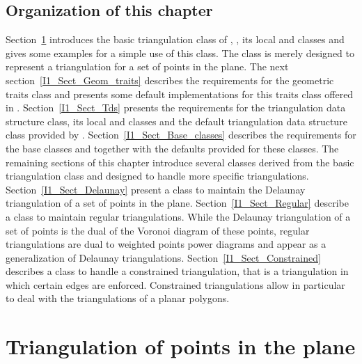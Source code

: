 \subsection*{Organization of this chapter}
Section~\ref{I1_Sect_Triangulation_2} introduces the basic triangulation class of \cgal ,
 , its local  and 
classes and gives some examples for a simple use of this class.
 The  class  is merely designed to represent 
a triangulation for a set of points in the plane.
The next section~\ref{I1_Sect_Geom_traits}
describes the requirements for the geometric
traits class and presents some default implementations
for this traits class offered in \cgal. 
Section~\ref{I1_Sect_Tds}  presents the requirements for the 
{triangulation data structure} class,
 its local  and 
classes and the default {triangulation data structure} class
provided by \cgal. 
Section~\ref{I1_Sect_Base_classes} describes the requirements
for the base classes  and   
together with the defaults provided for these classes.
The remaining sections of this chapter introduce
several classes derived from the basic triangulation class
and designed to handle more specific triangulations.
Section~\ref{I1_Sect_Delaunay} present a class to 
maintain the Delaunay triangulation of a set of points in the plane.
 Section~\ref{I1_Sect_Regular}
describe a class to maintain regular triangulations.
While the Delaunay triangulation of a set of points
is the dual of the Voronoi
diagram of these points,
 regular triangulations are dual to weighted points power diagrams
and  appear as a generalization of
Delaunay triangulations. Section~\ref{I1_Sect_Constrained} 
describes a class to handle a constrained triangulation,
that is a triangulation in which certain edges are enforced.
Constrained triangulations allow in particular to deal with the 
triangulations of a planar polygons.

 

\section{Triangulation of points in the plane }
\label{I1_Sect_Triangulation_2}

